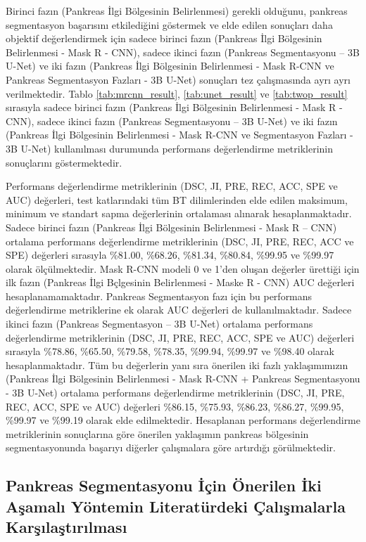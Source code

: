 Birinci fazın (Pankreas İlgi Bölgesinin Belirlenmesi) gerekli olduğunu, pankreas segmentasyon başarısını etkilediğini göstermek ve elde edilen sonuçları daha objektif değerlendirmek için sadece birinci fazın (Pankreas İlgi Bölgesinin Belirlenmesi - Mask R - CNN), sadece ikinci fazın (Pankreas Segmentasyonu – 3B U-Net) ve iki fazın (Pankreas İlgi Bölgesinin Belirlenmesi - Mask R-CNN ve Pankreas Segmentasyon Fazları - 3B U-Net) sonuçları tez çalışmasında ayrı ayrı verilmektedir. Tablo \ref{tab:mrcnn_result}, \ref{tab:unet_result} ve \ref{tab:twop_result} sırasıyla sadece birinci fazın (Pankreas İlgi Bölgesinin Belirlenmesi - Mask R - CNN), sadece ikinci fazın (Pankreas Segmentasyonu – 3B U-Net) ve iki fazın (Pankreas İlgi Bölgesinin Belirlenmesi - Mask R-CNN ve Segmentasyon Fazları - 3B U-Net) kullanılması durumunda performans değerlendirme metriklerinin sonuçlarını göstermektedir.

Performans değerlendirme metriklerinin (DSC, JI, PRE, REC, ACC, SPE ve AUC) değerleri, test katlarındaki tüm BT dilimlerinden elde edilen maksimum, minimum ve standart sapma değerlerinin ortalaması alınarak hesaplanmaktadır. Sadece birinci fazın (Pankreas İlgi Bölgesinin Belirlenmesi - Mask R – CNN) ortalama  performans değerlendirme metriklerinin (DSC, JI, PRE, REC, ACC ve SPE) değerleri sırasıyla \%81.00, \%68.26, \%81.34, \%80.84, \%99.95 ve \%99.97 olarak ölçülmektedir. Mask R-CNN modeli 0 ve 1'den oluşan değerler ürettiği için ilk fazın (Pankreas İlgi Bçlgesinin Belirlenmesi - Maske R - CNN) AUC değerleri hesaplanamamaktadır. Pankreas Segmentasyon fazı için bu performans değerlendirme metriklerine ek olarak AUC değerleri de kullanılmaktadır. Sadece ikinci fazın (Pankreas Segmentasyon – 3B U-Net) ortalama performans değerlendirme metriklerinin (DSC, JI, PRE, REC, ACC, SPE ve AUC) değerleri sırasıyla \%78.86, \%65.50, \%79.58, \%78.35, \%99.94, \%99.97 ve \%98.40 olarak hesaplanmaktadır. Tüm bu değerlerin yanı sıra önerilen iki fazlı yaklaşımımızın (Pankreas İlgi Bölgesinin Belirlenmesi - Mask R-CNN + Pankreas Segmentasyonu - 3B U-Net) ortalama performans değerlendirme metriklerinin (DSC, JI, PRE, REC, ACC, SPE ve AUC) değerleri \%86.15, \%75.93, \%86.23, \%86.27, \%99.95, \%99.97 ve \%99.19 olarak elde edilmektedir. Hesaplanan performans değerlendirme metriklerinin sonuçlarına göre önerilen yaklaşımın pankreas bölgesinin segmentasyonunda başarıyı diğerler çalışmalara göre artırdığı görülmektedir.

\subsection{Pankreas Segmentasyonu İçin Önerilen İki Aşamalı Yöntemin Literatürdeki Çalışmalarla Karşılaştırılması}


